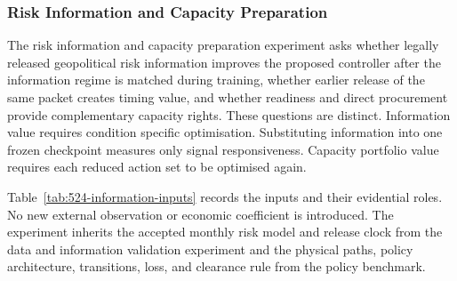 \documentclass[a4paper,fleqn]{cas-sc}
\begin{document}
\FloatBarrier

\subsubsection{Risk Information and Capacity Preparation}
\label{subsubsec:released-risk-capacity}

The risk information and capacity preparation experiment asks whether legally released geopolitical risk
information improves the proposed controller after the information regime is
matched during training, whether earlier release of the same packet creates
timing value, and whether readiness and direct procurement provide complementary
capacity rights. These questions are distinct. Information value requires
condition specific optimisation. Substituting information into one frozen
checkpoint measures only signal responsiveness. Capacity portfolio value
requires each reduced action set to be optimised again.

Table~\ref{tab:524-information-inputs} records the inputs and their evidential
roles. No new external observation or economic coefficient is introduced. The
experiment inherits the accepted monthly risk model and release clock from
the data and information validation experiment and the physical paths, policy
architecture, transitions, loss, and clearance rule from the policy benchmark.
\end{document}
